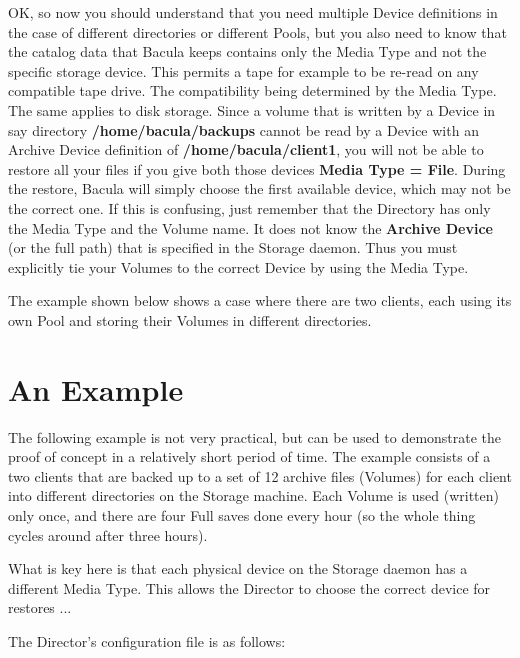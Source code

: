 OK, so now you should understand that you need multiple Device definitions
in the case of different directories or different Pools, but you also 
need to know that the catalog data that Bacula keeps contains only
the Media Type and not the specific storage device.  This permits a tape 
for example to be re-read on any compatible tape drive.  The compatibility
being determined by the Media Type.  The same applies to disk storage.
Since a volume that is written by a Device in say directory {\bf
/home/bacula/backups}  cannot be read by a Device with an Archive Device
definition of {\bf /home/bacula/client1}, you will not be able to
restore all your files if you give both those devices 
{\bf Media Type = File}. During the restore, Bacula will simply choose 
the first available device, which may not be the correct one.  If this
is confusing, just remember that the Directory has only the Media Type
and the Volume name.  It does not know the {\bf Archive Device} (or the
full path) that is specified in the Storage daemon.  Thus you must
explicitly tie your Volumes to the correct Device by using the Media Type.

The example shown below shows a case where there are two clients, each
using its own Pool and storing their Volumes in different directories.
 

\label{Example2}
\section{An Example}

The following example is not very practical, but can be used to demonstrate
the proof of concept in a relatively short period of time. The example
consists of a two clients that are backed up to a set of 12 archive files
(Volumes) for each client into different directories on the Storage
machine.  Each Volume is used (written) only once, and there are four Full
saves done every hour (so the whole thing cycles around after three hours).

What is key here is that each physical device on the Storage daemon 
has a different Media Type. This allows the Director to choose the
correct device for restores ...

The Director's configuration file is as follows: 

